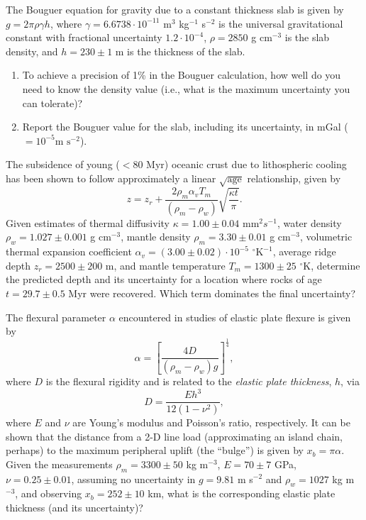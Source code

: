\begin{problem}
The Bouguer equation for gravity due to a constant thickness slab is given by $g = 2 \pi \rho \gamma h$, where
$\gamma = 6.6738\cdot10^{-11}$ m$^3$ kg$^{-1}$ s$^{-2}$ is the universal gravitational constant with fractional uncertainty
$1.2\cdot10^{-4}$, $\rho = 2850$ g cm$^{-3}$ is the slab density, and $h = 230\pm1$ m is the thickness of the slab.  
\begin{enumerate}[label=\alph*)]
	\item To achieve a precision of 1\% in the Bouguer calculation, how well do you need to know the density
	value (i.e., what is the maximum uncertainty you can tolerate)?
	\item Report the Bouguer value for the slab, including its uncertainty, in mGal ($= 10^{-5} \mbox{m s}^{-2}$).
\end{enumerate}
\end{problem}

\begin{problem}
The subsidence of young ($< 80$ Myr) oceanic crust due to lithospheric cooling has been
shown to follow approximately a linear $\sqrt {\mbox{age}}$ relationship, given by
$$
z = z_r + \frac{2 \rho_m \alpha_v T_m}{(\rho_m - \rho_w)} \sqrt{\frac{\kappa t}{\pi}}.
$$
Given estimates of thermal diffusivity $\kappa = 1.00 \pm 0.04 \mbox{ mm}^2s^{-1}$, water density
$\rho_w = 1.027 \pm 0.001$ g cm$^{-3}$, mantle density $\rho_m = 3.30 \pm 0.01$ g cm$^{-3}$,
volumetric thermal expansion coefficient $\alpha_v = (3.00 \pm 0.02) \cdot 10^{-5}$ $^{\circ}\mbox{K}^{-1}$,
average ridge depth $z_r = 2500 \pm 200$ m, and mantle temperature $T_m = 1300 \pm 25$ $^{\circ}$K,
determine the predicted depth and its uncertainty for a location where rocks of age
$t = 29.7 \pm 0.5$ Myr were recovered.  Which term dominates the final uncertainty?
\end{problem}

\begin{problem}
The flexural parameter $\alpha$ encountered in studies of elastic plate flexure is given by
$$
\alpha = \left [ \frac{4D}{(\rho_m - \rho_w)g} \right ]^\frac{1}{4},
$$
where $D$ is the flexural rigidity and is related to the \emph{elastic plate thickness}, $h$, via
$$
D = \frac{E h^3}{12 (1 - \nu^2)},
$$
where $E$ and $\nu$ are Young's modulus and Poisson's ratio, respectively.
It can be shown that the distance from a 2-D line load (approximating an island chain, perhaps) to
the maximum peripheral uplift (the ``bulge'') is given by $x_b = \pi \alpha$.  Given the measurements
$\rho_m = 3300 \pm 50$ kg m$^{-3}$, $E = 70 \pm 7$ GPa, $\nu = 0.25 \pm 0.01$, assuming no
uncertainty in $g = 9.81$ m s$^{-2}$ and $\rho_w = 1027$ kg m$^{-3}$, and observing $x_b = 252 \pm 10$ km,
what is the corresponding elastic plate thickness (and its uncertainty)?
\end{problem}

